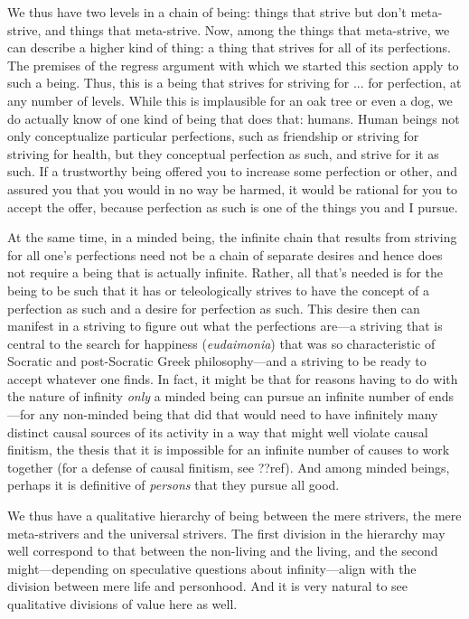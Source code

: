 We thus have two levels in a chain of being: things that strive but don't meta-strive, and things that meta-strive. Now, among the things that meta-strive,
we can describe a higher kind of thing: a thing that strives for all of its perfections. The premises of the regress argument with which we started this
section apply to such a being. Thus, this is a being that strives for striving for ... for perfection, at any number of levels. While this is implausible
for an oak tree or even a dog, we do actually know of one kind of being that does that: humans. Human beings not only conceptualize particular perfections, such as friendship
or striving for striving for health, but they conceptual perfection as such, and strive for it as such. If a trustworthy being offered you to increase
some perfection or other, and assured you that you would in no way be harmed, it would be rational for you to accept the offer, because perfection as
such is one of the things you and I pursue. 

At the same time, in a minded being, the infinite chain that results from striving for all one's perfections need not be a chain of separate desires
and hence does not require a being that is actually infinite. Rather, all that's needed is for the being to be such that it has or teleologically strives 
to have the concept of a perfection as such and a desire for perfection as such. This desire then can manifest in a striving to figure out what the perfections are---a striving that is central to
the search for happiness (\textit{eudaimonia}) that was so characteristic of Socratic and post-Socratic Greek philosophy---and a striving to be ready
to accept whatever one finds. In fact, it might be that for reasons having to do with the nature of infinity \textit{only} a minded being can pursue
an infinite number of ends---for any non-minded being that did that would need to have infinitely many distinct causal sources of its activity in 
a way that might well violate causal finitism, the thesis that it is impossible for an infinite number of causes to work together (for a defense
of causal finitism, see ??ref). And among minded beings, perhaps it is definitive of \textit{persons} that they pursue all good.

We thus have a qualitative hierarchy of being between the mere strivers, the mere meta-strivers and the universal strivers. The first division in
the hierarchy may well correspond to that between the non-living and the living, and the second might---depending on speculative questions about
infinity---align with the division between mere life and personhood. And it is very natural to see qualitative divisions of value here as well.

\chaptertail

